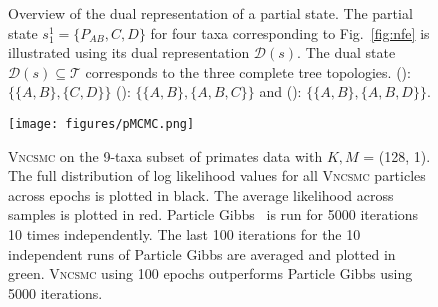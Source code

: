 \documentclass[accepted]{uai2021} %
\theoremstyle{definition}
\begin{document}
\begin{figure}[ht!]
\centering
{}
\caption{Overview of the dual representation of a partial state. The partial state $s_{1}^1 = \{P_{AB},C,D\}$ for four taxa corresponding to Fig.~\ref{fig:nfe} is illustrated using its dual representation $\mathcal{D}(s)$. The dual state $\mathcal{D}(s)\subseteq \mathcal{T}$ corresponds to the three complete tree topologies.  (): $\{ \{A,B\},\{C,D\}\}$ (): $ \{\{A,B\}, \{A,B,C\}\}$ and (): $ \{\{A,B\}, \{A,B,D\}\}$.}
\label{fig:dualphyhlo}
\end{figure}


\begin{figure}%
\centering
\texttt{[image: figures/pMCMC.png]}
\caption{\textsc{Vncsmc} on the 9-taxa subset of primates data with $K, M$ = (128, 1). The full distribution of log likelihood values for all \textsc{Vncsmc} particles across epochs is plotted in black. The average likelihood across samples is plotted in red. Particle Gibbs~\citep{wang2020particle} is run for 5000 iterations 10 times independently. The last 100 iterations for the 10 independent runs of Particle Gibbs are averaged and plotted in green. \textsc{Vncsmc} using 100 epochs outperforms Particle Gibbs using 5000 iterations.}
\label{fig:pMCMC}
\end{figure} 
\end{document}
